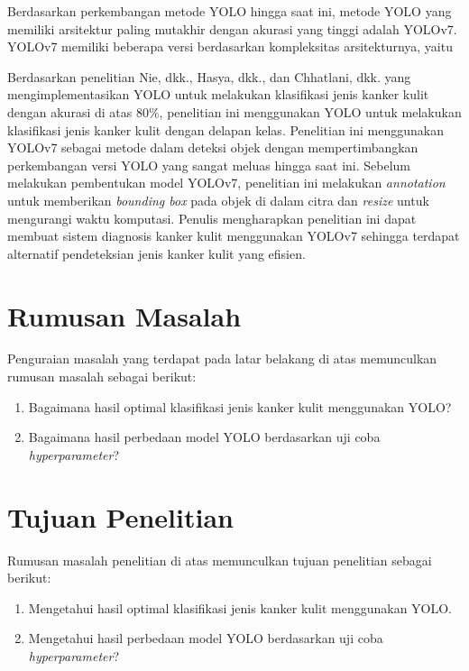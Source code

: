     Berdasarkan perkembangan metode YOLO hingga saat ini, metode YOLO yang memiliki arsitektur paling mutakhir dengan akurasi yang tinggi adalah YOLOv7. YOLOv7 memiliki beberapa versi berdasarkan kompleksitas arsitekturnya, yaitu 

    Berdasarkan penelitian Nie, dkk., Hasya, dkk., dan Chhatlani, dkk. yang mengimplementasikan YOLO untuk melakukan klasifikasi jenis kanker kulit dengan akurasi di atas $80\%$, penelitian ini menggunakan YOLO untuk melakukan klasifikasi jenis kanker kulit dengan delapan kelas. Penelitian ini menggunakan YOLOv7 sebagai metode dalam deteksi objek dengan mempertimbangkan perkembangan versi YOLO yang sangat meluas hingga saat ini. Sebelum melakukan pembentukan model YOLOv7, penelitian ini melakukan \textit{annotation} untuk memberikan \textit{bounding box} pada objek di dalam citra dan \textit{resize} untuk mengurangi waktu komputasi. Penulis mengharapkan penelitian ini dapat membuat sistem diagnosis kanker kulit menggunakan YOLOv7 sehingga terdapat alternatif pendeteksian jenis kanker kulit yang efisien.

    \section{Rumusan Masalah}
    Penguraian masalah yang terdapat pada latar belakang di atas memunculkan rumusan masalah sebagai berikut:
    \begin{enumerate}
        \item Bagaimana hasil optimal klasifikasi jenis kanker kulit menggunakan YOLO?
        \item Bagaimana hasil perbedaan model YOLO berdasarkan uji coba \textit{hyperparameter}?
    \end{enumerate}

    \section{Tujuan Penelitian}
    Rumusan masalah penelitian di atas memunculkan tujuan penelitian sebagai berikut:
    \begin{enumerate}
        \item Mengetahui hasil optimal klasifikasi jenis kanker kulit menggunakan YOLO.
        \item Mengetahui hasil perbedaan model YOLO berdasarkan uji coba \textit{hyperparameter}?
    \end{enumerate}

